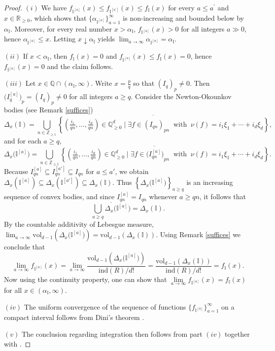 \documentclass[12pt,a4paper]{amsart}
\theoremstyle{plain}
\theoremstyle{definition}
\numberwithin{equation}{theorem}
\begin{document}
\begin{proof}
\textit{$(i)$} We have $f_{\mathbb{I}^{[a]}}(x) \leq f_{\mathbb{I}^{[a^{\prime}]}}(x) \leq f_{\mathbb{I}}(x)$ for every $a\leq a^{\prime}$ and $x\in\mathbb{R}_{\geq 0}$, which shows that $\{\alpha_{\mathbb{I}^{[a]}}\}_{a=1}^{\infty}$ is non-increasing and bounded below by $\alpha_{\mathbb{I}}$. Moreover, for every real number $x>\alpha_{\mathbb{I}}$, $f_{\mathbb{I}^{[a]}}(x)>0$ for all integers $a\gg 0$, hence $\alpha_{\mathbb{I}^{[a]}}\leq x$. Letting $x\downarrow \alpha_{\mathbb{I}}$ yields $\lim_{a\to\infty}\alpha_{\mathbb{I}^{[a]}}=\alpha_{\mathbb{I}}$.

\textit{$(ii)$} If $x<\alpha_{\mathbb{I}}$, then $f_{\mathbb{I}}(x)=0$ and $f_{\mathbb{I}^{[a]}}(x)\leq f_{\mathbb{I}}(x)=0$, hence $f_{\mathbb{I}^{[a]}}(x)= 0$ and the claim follows.

\textit{$(iii)$} Let $x\in \mathbb{Q}\cap (\alpha_{\mathbb{I}},\infty)$. Write $x=\tfrac{p}{q}$ so that ${(I_q)}_p\neq 0$. Then ${\big(I^{[a]}_q\big)}_p = {(I_q)}_p \neq 0$ for all integers $a\geq q$. Consider the Newton-Okounkov bodies (see Remark \ref{suffices})
$$\Delta_x(\mathbb{I}) = \overline{\bigcup_{n\in\mathbb{Z}_{\geq 1}}\left\{\left(\tfrac{i_1}{qn},\ldots,\tfrac{i_d}{qn}\right)\in\mathbb{Q}_{\geq 0}^d \mid \exists f\in {\left(I_{qn}\right)}_{pn}\;\;\text{with}\;\;\nu(f)=i_1\xi_1+\cdots+i_d\xi_d\right\}},$$ and for each $a\geq q$,
$$\Delta_x\big(\mathbb{I}^{[a]}\big) = \overline{\bigcup_{n\in\mathbb{Z}_{\geq 1}}\left\{\left(\tfrac{i_1}{qn},\ldots,\tfrac{i_d}{qn}\right)\in\mathbb{Q}_{\geq 0}^d \mid \exists f\in {\big(I^{[a]}_{qn}\big)}_{pn}\;\;\text{with}\;\;\nu(f)=i_1\xi_1+\cdots+i_d\xi_d\right\}}.$$
Because $I^{[a]}_{qn} \subseteq I^{[a']}_{qn} \subseteq I_{qn}$ for $a \leq a'$, we obtain $\Delta_x(\mathbb{I}^{[a]}) \subseteq \Delta_x(\mathbb{I}^{[a']}) \subseteq \Delta_x(\mathbb{I})$. Thus $\left\{\Delta_x\big(\mathbb{I}^{[a]}\big)\right\}_{a\geq q}$ is an increasing sequence of convex bodies, and since $I^{[a]}_{qn} = I_{qn}$ whenever $a \geq qn$, it follows that
\[
\overline{\bigcup_{a\geq q} \Delta_x\big(\mathbb{I}^{[a]}\big)} = \Delta_x(\mathbb{I}).
\]
By the countable additivity of Lebesgue measure, $\lim_{a\to\infty}\mathrm{vol}_{d-1}\left(\Delta_x\big(\mathbb{I}^{[a]}\big)\right) = \mathrm{vol}_{d-1}\left(\Delta_x(\mathbb{I})\right)$. Using Remark \ref{suffices} we conclude that $$\lim\limits_{a\to\infty} f_{\mathbb{I}^{[a]}}(x) = \lim\limits_{a\to\infty} \dfrac{\mathrm{vol}_{d-1}\left(\Delta_x\big(\mathbb{I}^{[a]}\big)\right)}{\mathrm{ind}(R)/d!} = \dfrac{\mathrm{vol}_{d-1}\left(\Delta_x(\mathbb{I})\right)}{\mathrm{ind}(R)/d!} = f_{\mathbb{I}}(x).$$ Now using the continuity property, one can show that $\lim\limits_{a\to\infty} f_{\mathbb{I}^{[a]}}(x)=f_{\mathbb{I}}(x)$ for all $x\in (\alpha_{\mathbb{I}},\infty)$.

\textit{$(iv)$} The uniform convergence of the sequence of functions $\{f_{\mathbb{I}^{[a]}}\}_{a=1}^{\infty}$ on a compact interval follows from Dini's theorem \cite[Theorem 7.13]{Rud76}.

\textit{$(v)$} The conclusion regarding integration then follows from part $(iv)$ together with \cite[Theorem 7.16]{Rud76}.
\end{proof}
\end{document}
